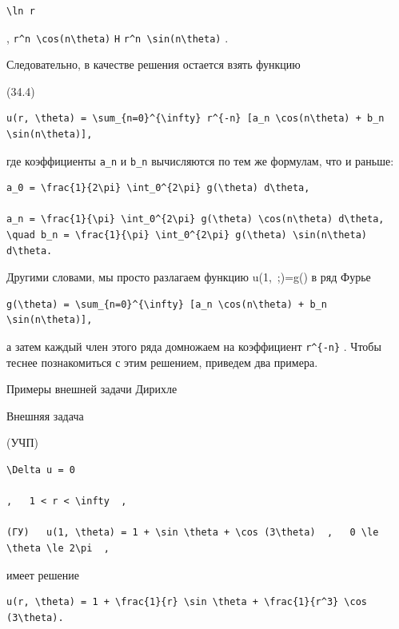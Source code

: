 \documentclass[
  ukrainian,
]{article}
\begin{document}
\begin{verbatim}
\ln r
\end{verbatim}

, \texttt{r\^{}n\ \textbackslash{}cos(n\textbackslash{}theta)}
\texttt{H} \texttt{r\^{}n\ \textbackslash{}sin(n\textbackslash{}theta)}
.

Следовательно, в качестве решения остается взять функцию

(34.4)

\begin{verbatim}
u(r, \theta) = \sum_{n=0}^{\infty} r^{-n} [a_n \cos(n\theta) + b_n \sin(n\theta)],
\end{verbatim}

где коэффициенты \texttt{a\_n} и \texttt{b\_n} вычисляются по тем же
формулам, что и раньше:

\begin{verbatim}
a_0 = \frac{1}{2\pi} \int_0^{2\pi} g(\theta) d\theta,

a_n = \frac{1}{\pi} \int_0^{2\pi} g(\theta) \cos(n\theta) d\theta, \quad b_n = \frac{1}{\pi} \int_0^{2\pi} g(\theta) \sin(n\theta) d\theta.
\end{verbatim}

Другими словами, мы просто разлагаем функцию
u\left(1,~;\theta\right)=g\left(\theta\right) в ряд Фурье

\begin{verbatim}
g(\theta) = \sum_{n=0}^{\infty} [a_n \cos(n\theta) + b_n \sin(n\theta)],
\end{verbatim}

а затем каждый член этого ряда домножаем на коэффициент
\texttt{r\^{}\{-n\}} . Чтобы теснее познакомиться с этим решением,
приведем два примера.

Примеры внешней задачи Дирихле

Внешняя задача

(УЧП)

\begin{verbatim}
\Delta u = 0

,   1 < r < \infty  ,

(ГУ)   u(1, \theta) = 1 + \sin \theta + \cos (3\theta)  ,   0 \le \theta \le 2\pi  ,
\end{verbatim}

имеет решение

\begin{verbatim}
u(r, \theta) = 1 + \frac{1}{r} \sin \theta + \frac{1}{r^3} \cos (3\theta).
\end{verbatim}
\end{document}
